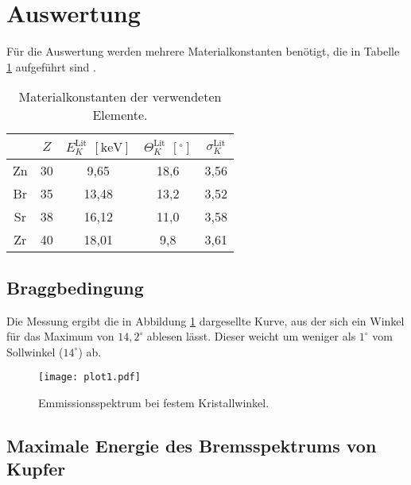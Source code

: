 \section{Auswertung}
\label{sec:Auswertung}

Für die Auswertung werden mehrere Materialkonstanten benötigt, die in Tabelle \ref{tab:material} aufgeführt sind \cite{Periode}.

\begin{table}
  \centering
  \caption{Materialkonstanten der verwendeten Elemente.}
  \label{tab:material}
  \begin{tabular}{c c c c c}
    \toprule
    & $Z$ & $E^\text{Lit}_K$ $[\si{\kilo\eV}]$ & $\Theta^\text{Lit}_K$ $[^\circ]$ & $\sigma^\text{Lit}_K$ \\
    \midrule
    Zn & 30 & 9,65 & 18,6 & 3,56 \\
    Br & 35 & 13,48 & 13,2 & 3,52 \\
    Sr & 38 & 16,12 & 11,0 & 3,58 \\
    Zr & 40 & 18,01 & 9,8 & 3,61 \\
    \bottomrule
  \end{tabular}
\end{table}

\subsection{Braggbedingung}

Die Messung ergibt die in Abbildung \ref{fig:plot1} dargesellte Kurve, aus der sich ein Winkel für das Maximum von $14,2^\circ$ ablesen lässt.
Dieser weicht um weniger als $1^\circ$ vom Sollwinkel ($14^\circ$) ab.
\begin{figure}
  \centering
  \texttt{[image: plot1.pdf]}
  \caption{Emmissionsspektrum bei festem Kristallwinkel.}
  \label{fig:plot1}
\end{figure}
\FloatBarrier

\subsection{Maximale Energie des Bremsspektrums von Kupfer}

